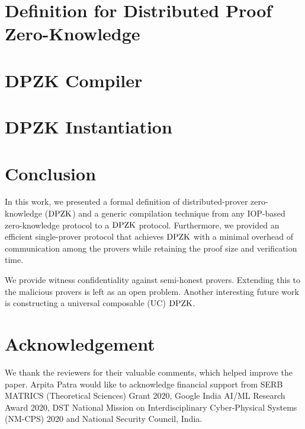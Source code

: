 \documentclass[USenglish,oneside,twocolumn]{article}
\begin{document}
\section{Definition for Distributed Proof Zero-Knowledge}
\label{sec:security model}

\section{DPZK Compiler}
\label{sec:compiler}

\section{DPZK Instantiation}
\label{sec:instantiations}

\section{Conclusion}
In this work, we presented a formal definition of distributed-prover zero-knowledge ($\text{DPZK}$) and a generic compilation technique from any IOP-based zero-knowledge protocol to a $\text{DPZK}$ protocol. Furthermore, we provided an efficient single-prover protocol that achieves $\text{DPZK}$ with a minimal overhead of communication among the provers while retaining the proof size and verification time.

We provide witness confidentiality against semi-honest provers. Extending this to the malicious provers is left as an open problem. Another interesting future work is constructing a universal composable (UC) $\text{DPZK}$.
\section*{Acknowledgement}
We thank the reviewers for their valuable comments, which helped improve the paper. Arpita Patra would like to acknowledge financial support from SERB MATRICS (Theoretical Sciences) Grant 2020, Google India AI/ML Research Award 2020, DST National Mission on Interdisciplinary Cyber-Physical Systems (NM-CPS) 2020 and National Security Council, India.




%
\appendix
\end{document}
